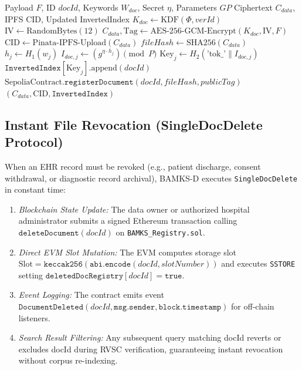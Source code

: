 \documentclass[journal,10pt,twocolumn]{IEEEtran}
\begin{document}
\begin{algorithm}[t]
\caption{Atomic File Ingestion (SingleDocAdd)}
\label{algo:add}
\begin{algorithmic}[1]
\REQUIRE Payload $F$, ID $docId$, Keywords $W_{doc}$, Secret $\eta$, Parameters $GP$
\ENSURE Ciphertext $C_{data}$, IPFS CID, Updated InvertedIndex
\STATE $K_{doc} \leftarrow \text{KDF}(\Phi, verId)$
\STATE $\text{IV} \leftarrow \text{RandomBytes}(12)$
\STATE $C_{data}, \text{Tag} \leftarrow \text{AES-256-GCM-Encrypt}(K_{doc}, \text{IV}, F)$
\STATE $\text{CID} \leftarrow \text{Pinata-IPFS-Upload}(C_{data})$
\STATE $fileHash \leftarrow \text{SHA256}(C_{data})$
    \STATE $h_j \leftarrow H_1(w_j)$
    \STATE $I_{doc,j} \leftarrow (g^{\eta \cdot h_j}) \pmod P$
    \STATE $\text{Key}_j \leftarrow H_2(\text{'tok\_'} \parallel I_{doc,j})$
    \STATE $\texttt{InvertedIndex}[\text{Key}_j].\text{append}(docId)$
\ENDFOR
\STATE $\text{SepoliaContract}.\texttt{registerDocument}(docId, fileHash, publicTag)$
\RETURN $(C_{data}, \text{CID}, \texttt{InvertedIndex})$
\end{algorithmic}
\end{algorithm}

\subsection{Instant File Revocation (SingleDocDelete Protocol)}
When an EHR record must be revoked (e.g., patient discharge, consent withdrawal, or diagnostic record archival), BAMKS-D executes \texttt{SingleDocDelete} in constant time:
\begin{enumerate}
    \item \textit{Blockchain State Update:} The data owner or authorized hospital administrator submits a signed Ethereum transaction calling $\texttt{deleteDocument}(docId)$ on \texttt{BAMKS\_Registry.sol}.
    \item \textit{Direct EVM Slot Mutation:} The EVM computes storage slot $\text{Slot} = \texttt{keccak256}(\texttt{abi.encode}(docId, slotNumber))$ and executes \texttt{SSTORE} setting $\texttt{deletedDocRegistry}[docId] = \texttt{true}$.
    \item \textit{Event Logging:} The contract emits event $\texttt{DocumentDeleted}(docId, \texttt{msg.sender}, \texttt{block.timestamp})$ for off-chain listeners.
    \item \textit{Search Result Filtering:} Any subsequent query matching docId reverts or excludes docId during RVSC verification, guaranteeing instant revocation without corpus re-indexing.
\end{enumerate}
\end{document}
